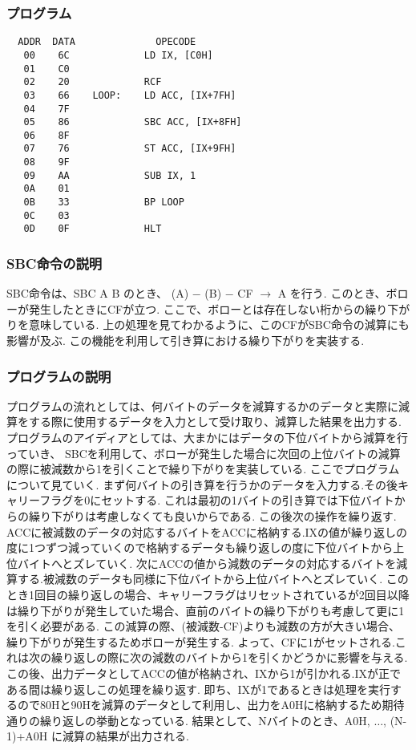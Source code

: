 \documentclass[titlepage]{jsarticle}
\theoremstyle{definition}
\begin{document}
\subsubsection{プログラム}

\begin{lstlisting}
  ADDR  DATA              OPECODE
   00    6C             LD IX, [C0H]
   01    C0
   02    20             RCF
   03    66    LOOP:    LD ACC, [IX+7FH]
   04    7F
   05    86             SBC ACC, [IX+8FH]
   06    8F
   07    76             ST ACC, [IX+9FH]
   08    9F
   09    AA             SUB IX, 1
   0A    01
   0B    33             BP LOOP
   0C    03
   0D    0F             HLT
\end{lstlisting}

\subsubsection{SBC命令の説明}
SBC命令は、SBC A B のとき、 (A) $-$ (B) $-$ CF $\rightarrow$ A を行う.
このとき、ボローが発生したときにCFが立つ.
ここで、ボローとは存在しない桁からの繰り下がりを意味している.
上の処理を見てわかるように、このCFがSBC命令の減算にも影響が及ぶ.
この機能を利用して引き算における繰り下がりを実装する.

\subsubsection{プログラムの説明}
プログラムの流れとしては、何バイトのデータを減算するかのデータと実際に減算をする際に使用するデータを入力として受け取り、減算した結果を出力する.
プログラムのアイディアとしては、大まかにはデータの下位バイトから減算を行っていき、
SBCを利用して、ボローが発生した場合に次回の上位バイトの減算の際に被減数から1を引くことで繰り下がりを実装している.
ここでプログラムについて見ていく.
まず何バイトの引き算を行うかのデータを入力する.その後キャリーフラグを0にセットする.
これは最初の1バイトの引き算では下位バイトからの繰り下がりは考慮しなくても良いからである.
この後次の操作を繰り返す.
ACCに被減数のデータの対応するバイトをACCに格納する.IXの値が繰り返しの度に1つずつ減っていくので格納するデータも繰り返しの度に下位バイトから上位バイトへとズレていく.
次にACCの値から減数のデータの対応するバイトを減算する.被減数のデータも同様に下位バイトから上位バイトへとズレていく.
このとき1回目の繰り返しの場合、キャリーフラグはリセットされているが2回目以降は繰り下がりが発生していた場合、直前のバイトの繰り下がりも考慮して更に1を引く必要がある.
この減算の際、(被減数-CF)よりも減数の方が大きい場合、繰り下がりが発生するためボローが発生する.
よって、CFに1がセットされる.これは次の繰り返しの際に次の減数のバイトから1を引くかどうかに影響を与える.
この後、出力データとしてACCの値が格納され、IXから1が引かれる.IXが正である間は繰り返しこの処理を繰り返す.
即ち、IXが1であるときは処理を実行するので80Hと90Hを減算のデータとして利用し、出力をA0Hに格納するため期待通りの繰り返しの挙動となっている.
結果として、Nバイトのとき、A0H, $\ldots$, (N-1)+A0H に減算の結果が出力される.
\end{document}
